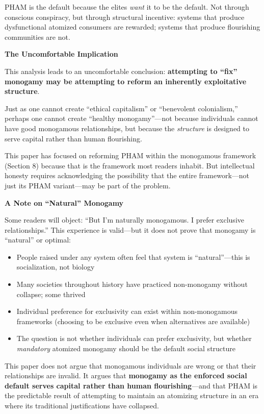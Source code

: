 \documentclass[12pt,openany]{book}
\numberwithin{equation}{chapter}
\begin{document}
PHAM is the default because the elites \textit{want} it to be the default. Not through conscious conspiracy, but through structural incentive: systems that produce dysfunctional atomized consumers are rewarded; systems that produce flourishing communities are not.

\textbf{The Uncomfortable Implication}

This analysis leads to an uncomfortable conclusion: \textbf{attempting to ``fix'' monogamy may be attempting to reform an inherently exploitative structure}.

Just as one cannot create ``ethical capitalism'' or ``benevolent colonialism,'' perhaps one cannot create ``healthy monogamy''---not because individuals cannot have good monogamous relationships, but because the \textit{structure} is designed to serve capital rather than human flourishing.

This paper has focused on reforming PHAM within the monogamous framework (Section 8) because that is the framework most readers inhabit. But intellectual honesty requires acknowledging the possibility that the entire framework---not just its PHAM variant---may be part of the problem.

\textbf{A Note on ``Natural'' Monogamy}

Some readers will object: ``But I'm naturally monogamous. I prefer exclusive relationships.'' This experience is valid---but it does not prove that monogamy is ``natural'' or optimal:

\begin{itemize}
    \item People raised under any system often feel that system is ``natural''---this is socialization, not biology
    \item Many societies throughout history have practiced non-monogamy without collapse; some thrived
    \item Individual preference for exclusivity can exist within non-monogamous frameworks (choosing to be exclusive even when alternatives are available)
    \item The question is not whether individuals can prefer exclusivity, but whether \textit{mandatory} atomized monogamy should be the default social structure
\end{itemize}

This paper does not argue that monogamous individuals are wrong or that their relationships are invalid. It argues that \textbf{monogamy as the enforced social default serves capital rather than human flourishing}---and that PHAM is the predictable result of attempting to maintain an atomizing structure in an era where its traditional justifications have collapsed.
\end{document}

